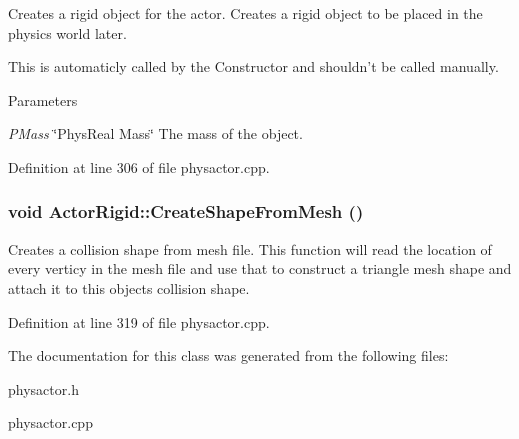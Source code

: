 Creates a rigid object for the actor. Creates a rigid object to be placed in the physics world later. \par
 This is automaticly called by the Constructor and shouldn't be called manually. 
\begin{DoxyParams}{Parameters}
\item[{\em PMass}]\char`\"{}PhysReal Mass\char`\"{} The mass of the object. \end{DoxyParams}


Definition at line 306 of file physactor.cpp.\hypertarget{classActorRigid_a1a1b7ca97c69bb5420a76116c388b3d1}{
\subsubsection[{CreateShapeFromMesh}]{\setlength{\rightskip}{0pt plus 5cm}void ActorRigid::CreateShapeFromMesh ()}}
\label{d5/d10/classActorRigid_a1a1b7ca97c69bb5420a76116c388b3d1}


Creates a collision shape from mesh file. This function will read the location of every verticy in the mesh file and use that to construct a triangle mesh shape and attach it to this objects collision shape. 

Definition at line 319 of file physactor.cpp.

The documentation for this class was generated from the following files:\begin{DoxyCompactItemize}
\item 
physactor.h\item 
physactor.cpp\end{DoxyCompactItemize}
